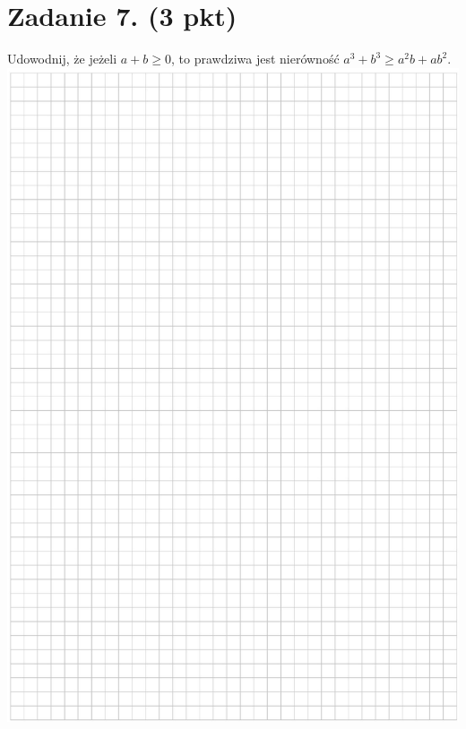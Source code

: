 \documentclass[10pt]{article}
\begin{document}
\section*{Zadanie 7. (3 pkt)}
Udowodnij, że jeżeli \(a+b \geq 0\), to prawdziwa jest nierówność \(a^{3}+b^{3} \geq a^{2} b+a b^{2}\).\\
\includegraphics[max width=\textwidth, center]{2024_11_21_606d6e4e152fe3e9f6feg-12}
\end{document}
